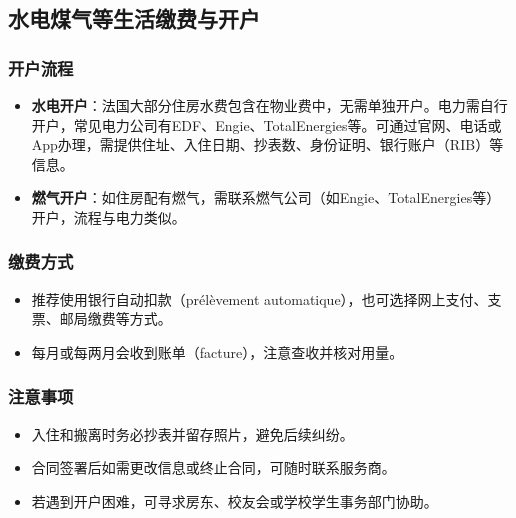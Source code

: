 \subsection{水电煤气等生活缴费与开户}

\subsubsection{开户流程}
\begin{itemize}
    \item \textbf{水电开户}：法国大部分住房水费包含在物业费中，无需单独开户。电力需自行开户，常见电力公司有EDF、Engie、TotalEnergies等。可通过官网、电话或App办理，需提供住址、入住日期、抄表数、身份证明、银行账户（RIB）等信息。
    \item \textbf{燃气开户}：如住房配有燃气，需联系燃气公司（如Engie、TotalEnergies等）开户，流程与电力类似。
\end{itemize}

\subsubsection{缴费方式}
\begin{itemize}
    \item 推荐使用银行自动扣款（prélèvement automatique），也可选择网上支付、支票、邮局缴费等方式。
    \item 每月或每两月会收到账单（facture），注意查收并核对用量。
\end{itemize}

\subsubsection{注意事项}
\begin{itemize}
    \item 入住和搬离时务必抄表并留存照片，避免后续纠纷。
    \item 合同签署后如需更改信息或终止合同，可随时联系服务商。
    \item 若遇到开户困难，可寻求房东、校友会或学校学生事务部门协助。
\end{itemize}

